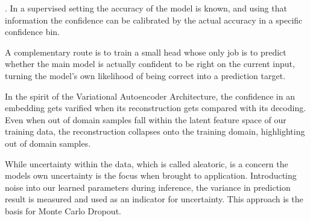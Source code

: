 


\cite{Guo2017Calibration}. In a supervised setting the accuracy of the model is known, and using that information
the confidence can be calibrated by the actual accuracy in a specific confidence bin.

A complementary route is to train a small head whose only job is to predict
whether the main model is actually confident to be right on the current input,
turning the model's own likelihood of being correct into a prediction target.

In the spirit of the Variational Autoencoder Architecture, the confidence in an embedding
gets varified when its reconstruction gets compared with its decoding. Even when out of domain samples fall within the
latent feature space of our training data, the reconstruction collapses onto the training domain, highlighting out of domain samples.



While uncertainty within the data, which is called aleatoric, is a concern the models own uncertainty is
the focus when brought to application. Introducting noise into our learned parameters during inference,
the variance in prediction result is measured and used as an indicator for uncertainty. This approach is the basis for 
Monte Carlo Dropout.




